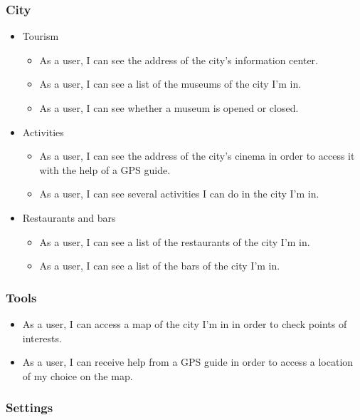 \documentclass[11pt, a4paper]{report}
\begin{document}
\subsubsection{City}

\begin{itemize}

\item Tourism
\begin{itemize} 
\item As a user, I can see the address of the city's information center.
\item As a user, I can see a list of the museums of the city I'm in.
\item As a user, I can see whether a museum is opened or closed.
\end{itemize}

\item Activities
\begin{itemize} 
\item As a user, I can see the address of the city's cinema in order to access it with the help of a GPS guide.
\item As a user, I can see several activities I can do in the city I'm in.

\end{itemize}

\item Restaurants and bars
\begin{itemize} 
\item As a user, I can see a list of the restaurants of the city I'm in.
\item As a user, I can see a list of the bars of the city I'm in.
\end{itemize}

\end{itemize}

\subsubsection{Tools}

\begin{itemize}
\item As a user, I can access a map of the city I'm in in order to check points of interests.
\item As a user, I can receive help from a GPS guide in order to access a location of my choice on the map.
\end{itemize}

\subsubsection{Settings}
\end{document}
